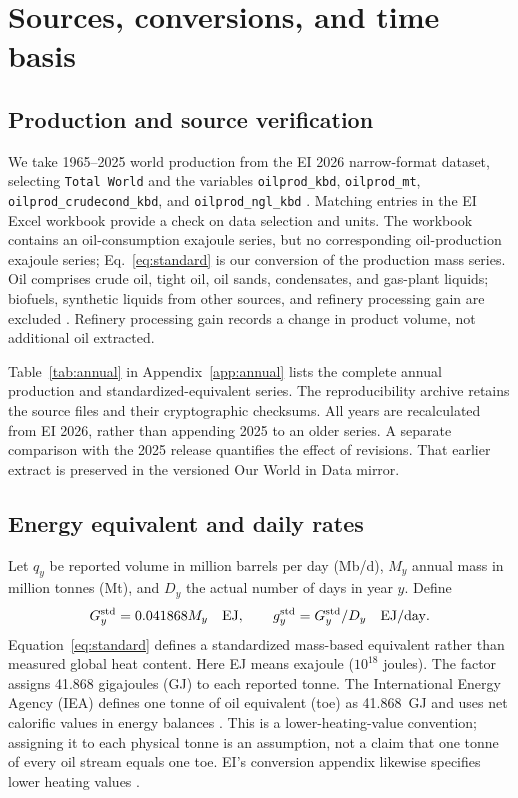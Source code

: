 \documentclass[reprint,aps,pra,longbibliography,floatfix]{revtex4-2}
\begin{document}
\section{Sources, conversions, and time basis}
\subsection{Production and source verification}
We take 1965--2025 world production from the EI 2026 narrow-format dataset, selecting \texttt{Total World} and the variables \texttt{oilprod\_kbd}, \texttt{oilprod\_mt}, \texttt{oilprod\_crudecond\_kbd}, and \texttt{oilprod\_ngl\_kbd} \citep{ei2026}. Matching entries in the EI Excel workbook provide a check on data selection and units. The workbook contains an oil-consumption exajoule series, but no corresponding oil-production exajoule series; Eq.~\eqref{eq:standard} is our conversion of the production mass series. Oil comprises crude oil, tight oil, oil sands, condensates, and gas-plant liquids; biofuels, synthetic liquids from other sources, and refinery processing gain are excluded \citep{eiMethod2026}. Refinery processing gain records a change in product volume, not additional oil extracted.

Table~\ref{tab:annual} in Appendix~\ref{app:annual} lists the complete annual production and standardized-equivalent series. The reproducibility archive retains the source files and their cryptographic checksums. All years are recalculated from EI 2026, rather than appending 2025 to an older series. A separate comparison with the 2025 release \citep{ei2025,owidEI2025} quantifies the effect of revisions. That earlier extract is preserved in the versioned Our World in Data mirror.

\subsection{Energy equivalent and daily rates}
Let $q_y$ be reported volume in million barrels per day (Mb/d), $M_y$ annual mass in million tonnes (Mt), and $D_y$ the actual number of days in year $y$. Define
\begin{equation}
 G_y^{\rm std}=0.041868M_y\quad\mathrm{EJ},\qquad
 g_y^{\rm std}=G_y^{\rm std}/D_y\quad\mathrm{EJ/day}.
 \label{eq:standard}
\end{equation}
Equation~\eqref{eq:standard} defines a standardized mass-based equivalent rather than measured global heat content. Here EJ means exajoule ($10^{18}$ joules). The factor assigns 41.868 gigajoules (GJ) to each reported tonne. The International Energy Agency (IEA) defines one tonne of oil equivalent (toe) as 41.868~GJ and uses net calorific values in energy balances \citep{ieaBalance,ieaGlossary}. This is a lower-heating-value convention; assigning it to each physical tonne is an assumption, not a claim that one tonne of every oil stream equals one toe. EI's conversion appendix likewise specifies lower heating values \citep{eiGuide2026}.
\end{document}
